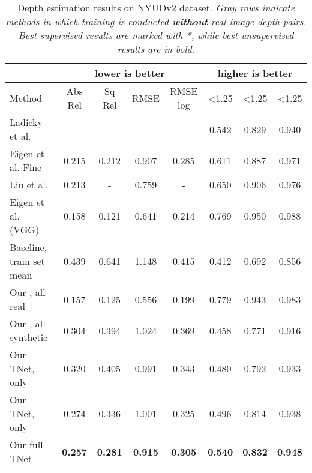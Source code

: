 \documentclass[runningheads]{llncs}
\begin{document}
\begin{table}[tb!]
	\begin{center}
		\renewcommand{\arraystretch}{1.4}
		\setlength{\arrayrulewidth}{0.8pt}
		\caption{Depth estimation results on NYUDv2 dataset\cite{silberman2012indoor}. \emph{Gray rows indicate methods in which training is conducted \textbf{without} real image-depth pairs. Best supervised results are marked with *, while best unsupervised results are in bold}.}
		\begin{tabular}{|l|c|c|c|c|c|c|c|}
			\hline
			\multicolumn{1}{|c|}{} &  \multicolumn{4}{c|}{\cellcolor[rgb]{0.6,0.8,1.0} lower is better} &  \multicolumn{3}{c|}{\cellcolor[rgb]{0.0,0.8,1.0} higher is better} \\
			\hline
			Method & \cellcolor[rgb]{0.6,0.8,1.0} {\tiny Abs Rel} & \cellcolor[rgb]{0.6,0.8,1.0} {\tiny Sq Rel} & \cellcolor[rgb]{0.6,0.8,1.0} {\tiny RMSE} & \cellcolor[rgb]{0.6,0.8,1.0} {\tiny RMSE log} & \cellcolor[rgb]{0.0,0.8,1.0} {\tiny <1.25} & \cellcolor[rgb]{0.0,0.8,1.0} {\tiny <1.25}  & \cellcolor[rgb]{0.0,0.8,1.0} {\tiny <1.25} \\
			\hline
			Ladicky et al. \cite{ladicky2014pulling} & - & - & - & - & 0.542 & 0.829 & 0.940 \\
			Eigen et al.\cite{eigen2014depth} Fine & 0.215 & 0.212 & 0.907 & 0.285 & 0.611 & 0.887 & 0.971 \\
			Liu et al. \cite{liu2016learning} & 0.213 & - & 0.759 & - & 0.650 & 0.906 & 0.976 \\
			Eigen et al.\cite{eigen2015predicting} (VGG) & 0.158 & 0.121 & 0.641 & 0.214 & 0.769 & 0.950 & 0.988 \\
			\hline 
			\rowcolor[rgb]{0.9,0.9,0.9}
			Baseline, train set mean & 0.439  & 0.641 & 1.148 & 0.415 & 0.412 & 0.692 & 0.856 \\  
			\hline
			Our , all-real &  0.157 & 0.125 & 0.556 & 0.199 & 0.779 & 0.943 & 0.983 \\
			\rowcolor[rgb]{0.9,0.9,0.9}
			Our , all-synthetic & 0.304 & 0.394 & 1.024 & 0.369 & 0.458 & 0.771 & 0.916 \\
			\rowcolor[rgb]{0.9,0.9,0.9}
			Our TNet,  only & 0.320 & 0.405 & 0.991 & 0.343 & 0.480 & 0.792 & 0.933 \\
			\rowcolor[rgb]{0.9,0.9,0.9}
			Our TNet,  only & 0.274 & 0.336 & 1.001 & 0.325 & 0.496 & 0.814 & 0.938 \\
			\rowcolor[rgb]{0.9,0.9,0.9}
			Our full TNet & {\bf 0.257} & {\bf 0.281} & {\bf 0.915} & {\bf 0.305}  & {\bf 0.540} & {\bf 0.832} & {\bf 0.948} \\
			\hline
		\end{tabular}
		\label{table:indoor}
	\end{center}
\end{table}
\end{document}
